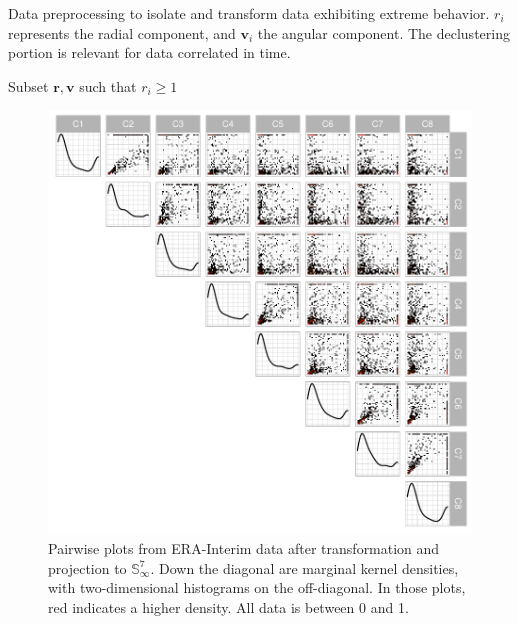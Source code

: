 \begin{algorithm}[htb]
    \footnotesize
   \caption{Data preprocessing to isolate and transform data exhibiting extreme behavior.  $r_i$
   represents the radial component, and $\bm{v}_i$ the angular component.  The declustering
   portion is relevant for data correlated in time.\label{algo:processing}}
  Subset $\bm{ r},\bm{ v}$ such that $r_i \geq 1$\\
\end{algorithm}

\begin{figure}[ht]%
    \centering
    \caption{Pairwise plots from ERA-Interim data after transformation and projection to ${\mathbb S}_{\infty}^{7}$.  Down the diagonal are marginal kernel densities, with two-dimensional histograms on the off-diagonal.  In those plots, red indicates a higher density.  All data is between 0 and 1.\label{fig:erai_data}}
    \includegraphics[width=.7\linewidth]{./images/data_transformed}
\end{figure}

